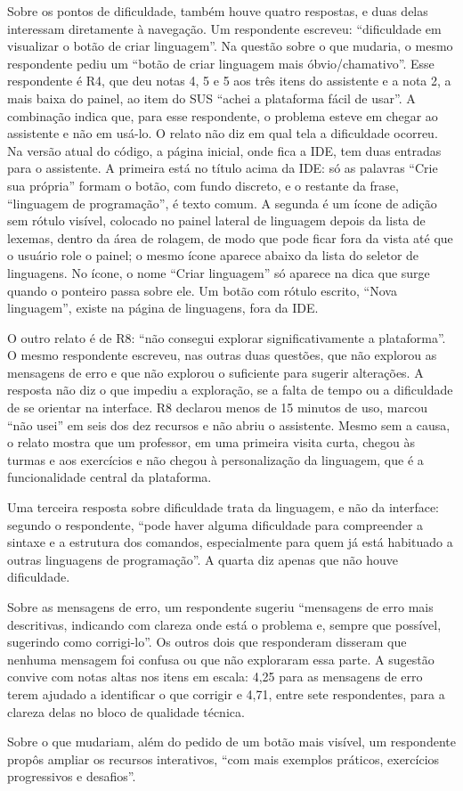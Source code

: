 Sobre os pontos de dificuldade, também houve quatro respostas, e duas delas interessam diretamente à navegação. Um respondente escreveu: ``dificuldade em visualizar o botão de criar linguagem''. Na questão sobre o que mudaria, o mesmo respondente pediu um ``botão de criar linguagem mais óbvio/chamativo''. Esse respondente é R4, que deu notas 4, 5 e 5 aos três itens do assistente e a nota 2, a mais baixa do painel, ao item do SUS ``achei a plataforma fácil de usar''. A combinação indica que, para esse respondente, o problema esteve em chegar ao assistente e não em usá-lo. O relato não diz em qual tela a dificuldade ocorreu. Na versão atual do código, a página inicial, onde fica a IDE, tem duas entradas para o assistente. A primeira está no título acima da IDE: só as palavras ``Crie sua própria'' formam o botão, com fundo discreto, e o restante da frase, ``linguagem de programação'', é texto comum. A segunda é um ícone de adição sem rótulo visível, colocado no painel lateral de linguagem depois da lista de lexemas, dentro da área de rolagem, de modo que pode ficar fora da vista até que o usuário role o painel; o mesmo ícone aparece abaixo da lista do seletor de linguagens. No ícone, o nome ``Criar linguagem'' só aparece na dica que surge quando o ponteiro passa sobre ele. Um botão com rótulo escrito, ``Nova linguagem'', existe na página de linguagens, fora da IDE.

O outro relato é de R8: ``não consegui explorar significativamente a plataforma''. O mesmo respondente escreveu, nas outras duas questões, que não explorou as mensagens de erro e que não explorou o suficiente para sugerir alterações. A resposta não diz o que impediu a exploração, se a falta de tempo ou a dificuldade de se orientar na interface. R8 declarou menos de 15 minutos de uso, marcou ``não usei'' em seis dos dez recursos e não abriu o assistente. Mesmo sem a causa, o relato mostra que um professor, em uma primeira visita curta, chegou às turmas e aos exercícios e não chegou à personalização da linguagem, que é a funcionalidade central da plataforma.

Uma terceira resposta sobre dificuldade trata da linguagem, e não da interface: segundo o respondente, ``pode haver alguma dificuldade para compreender a sintaxe e a estrutura dos comandos, especialmente para quem já está habituado a outras linguagens de programação''. A quarta diz apenas que não houve dificuldade.

Sobre as mensagens de erro, um respondente sugeriu ``mensagens de erro mais descritivas, indicando com clareza onde está o problema e, sempre que possível, sugerindo como corrigi-lo''. Os outros dois que responderam disseram que nenhuma mensagem foi confusa ou que não exploraram essa parte. A sugestão convive com notas altas nos itens em escala: 4,25 para as mensagens de erro terem ajudado a identificar o que corrigir e 4,71, entre sete respondentes, para a clareza delas no bloco de qualidade técnica.

Sobre o que mudariam, além do pedido de um botão mais visível, um respondente propôs ampliar os recursos interativos, ``com mais exemplos práticos, exercícios progressivos e desafios''.

